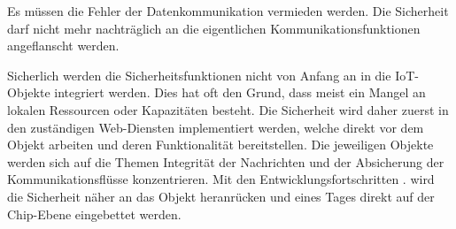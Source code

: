 Es müssen die Fehler der Datenkommunikation vermieden werden. Die Sicherheit darf nicht mehr nachträglich an die eigentlichen Kommunikationsfunktionen angeflanscht  werden.

Sicherlich werden die Sicherheitsfunktionen nicht von Anfang an in die IoT-Objekte integriert werden. Dies hat oft den Grund, dass meist ein Mangel an lokalen Ressourcen oder Kapazitäten besteht. Die Sicherheit wird daher zuerst in den zuständigen Web-Diensten implementiert werden, welche direkt vor dem Objekt arbeiten und deren Funktionalität bereitstellen. Die jeweiligen Objekte werden sich auf die Themen Integrität der Nachrichten und der Absicherung der Kommunikationsflüsse konzentrieren. Mit den Entwicklungsfortschritten  . wird die Sicherheit näher an das Objekt heranrücken und eines Tages direkt auf der Chip-Ebene eingebettet werden. 